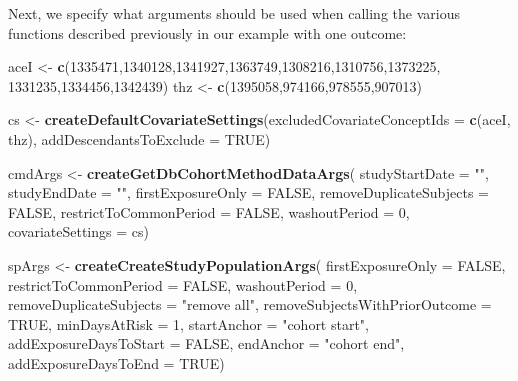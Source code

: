 \documentclass[
  11pt]{book}
\newenvironment{Shaded}{\begin{snugshade}}{\end{snugshade}}
\newcommand{\AttributeTok}[1]{\textcolor[rgb]{0.13,0.29,0.53}{#1}}
\newcommand{\ConstantTok}[1]{\textcolor[rgb]{0.56,0.35,0.01}{#1}}
\newcommand{\DecValTok}[1]{\textcolor[rgb]{0.00,0.00,0.81}{#1}}
\newcommand{\FunctionTok}[1]{\textcolor[rgb]{0.13,0.29,0.53}{\textbf{#1}}}
\newcommand{\NormalTok}[1]{#1}
\newcommand{\OtherTok}[1]{\textcolor[rgb]{0.56,0.35,0.01}{#1}}
\newcommand{\StringTok}[1]{\textcolor[rgb]{0.31,0.60,0.02}{#1}}
\theoremstyle{definition}
\theoremstyle{definition}
\theoremstyle{definition}
\theoremstyle{definition}
\theoremstyle{remark}
\begin{document}
Next, we specify what arguments should be used when calling the various functions described previously in our example with one outcome:

\begin{Shaded}
\begin{Highlighting}[]
\NormalTok{aceI }\OtherTok{\textless{}{-}} \FunctionTok{c}\NormalTok{(}\DecValTok{1335471}\NormalTok{,}\DecValTok{1340128}\NormalTok{,}\DecValTok{1341927}\NormalTok{,}\DecValTok{1363749}\NormalTok{,}\DecValTok{1308216}\NormalTok{,}\DecValTok{1310756}\NormalTok{,}\DecValTok{1373225}\NormalTok{,}
          \DecValTok{1331235}\NormalTok{,}\DecValTok{1334456}\NormalTok{,}\DecValTok{1342439}\NormalTok{)}
\NormalTok{thz }\OtherTok{\textless{}{-}} \FunctionTok{c}\NormalTok{(}\DecValTok{1395058}\NormalTok{,}\DecValTok{974166}\NormalTok{,}\DecValTok{978555}\NormalTok{,}\DecValTok{907013}\NormalTok{)}

\NormalTok{cs }\OtherTok{\textless{}{-}} \FunctionTok{createDefaultCovariateSettings}\NormalTok{(}\AttributeTok{excludedCovariateConceptIds =} \FunctionTok{c}\NormalTok{(aceI,}
\NormalTok{                                                                     thz),}
                                     \AttributeTok{addDescendantsToExclude =} \ConstantTok{TRUE}\NormalTok{)}

\NormalTok{cmdArgs }\OtherTok{\textless{}{-}} \FunctionTok{createGetDbCohortMethodDataArgs}\NormalTok{(}
  \AttributeTok{studyStartDate =} \StringTok{""}\NormalTok{,}
  \AttributeTok{studyEndDate =} \StringTok{""}\NormalTok{,}
  \AttributeTok{firstExposureOnly =} \ConstantTok{FALSE}\NormalTok{,}
  \AttributeTok{removeDuplicateSubjects =} \ConstantTok{FALSE}\NormalTok{,}
  \AttributeTok{restrictToCommonPeriod =} \ConstantTok{FALSE}\NormalTok{,}
  \AttributeTok{washoutPeriod =} \DecValTok{0}\NormalTok{,}
  \AttributeTok{covariateSettings =}\NormalTok{ cs)}

\NormalTok{spArgs }\OtherTok{\textless{}{-}} \FunctionTok{createCreateStudyPopulationArgs}\NormalTok{(}
  \AttributeTok{firstExposureOnly =} \ConstantTok{FALSE}\NormalTok{,}
  \AttributeTok{restrictToCommonPeriod =} \ConstantTok{FALSE}\NormalTok{,}
  \AttributeTok{washoutPeriod =} \DecValTok{0}\NormalTok{,}
  \AttributeTok{removeDuplicateSubjects =} \StringTok{"remove all"}\NormalTok{,}
  \AttributeTok{removeSubjectsWithPriorOutcome =} \ConstantTok{TRUE}\NormalTok{,}
  \AttributeTok{minDaysAtRisk =} \DecValTok{1}\NormalTok{,}
  \AttributeTok{startAnchor =} \StringTok{"cohort start"}\NormalTok{,}
  \AttributeTok{addExposureDaysToStart =} \ConstantTok{FALSE}\NormalTok{,}
  \AttributeTok{endAnchor =} \StringTok{"cohort end"}\NormalTok{,}
  \AttributeTok{addExposureDaysToEnd =} \ConstantTok{TRUE}\NormalTok{)}


\end{Highlighting}
\end{Shaded}
\end{document}
